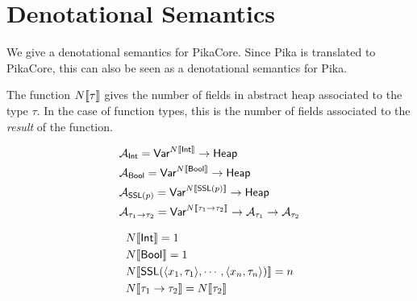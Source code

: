 \section{Denotational Semantics}

We give a denotational semantics for PikaCore. Since Pika is translated to PikaCore, this can
also be seen as a denotational semantics for Pika.

The function $N\llbracket \tau \rrbracket$ gives the number of fields in abstract
heap associated to the type $\tau$. In the case of function types, this
is the number of fields associated to the \textit{result} of the function.

\begin{align*}
  &\mathcal{A}_{\textsf{Int}} = \textsf{Var}^{N\llbracket \textsf{Int} \rrbracket} \rightarrow \textsf{Heap}
  \\
  &\mathcal{A}_{\textsf{Bool}} = \textsf{Var}^{N\llbracket \textsf{Bool} \rrbracket} \rightarrow \textsf{Heap}
  \\
  &\mathcal{A}_{\textsf{SSL}(p)} = \textsf{Var}^{N\llbracket \textsf{SSL}(p) \rrbracket} \rightarrow \textsf{Heap}
  \\
  &\mathcal{A}_{\tau_1 \rightarrow \tau_2} = \textsf{Var}^{N\llbracket \tau_1 \rightarrow \tau_2 \rrbracket} \rightarrow \mathcal{A}_{\tau_1} \rightarrow \mathcal{A}_{\tau_2}
\end{align*}

\begin{align*}
  &N\llbracket \textsf{Int} \rrbracket = 1
  \\
  &N\llbracket \textsf{Bool} \rrbracket = 1
  \\
  &N\llbracket \textsf{SSL}(\langle x_1, \tau_1 \rangle, \cdots, \langle x_n, \tau_n \rangle) \rrbracket = n
  \\
  &N\llbracket \tau_1 \rightarrow \tau_2 \rrbracket = N\llbracket \tau_2 \rrbracket
\end{align*}
\\

